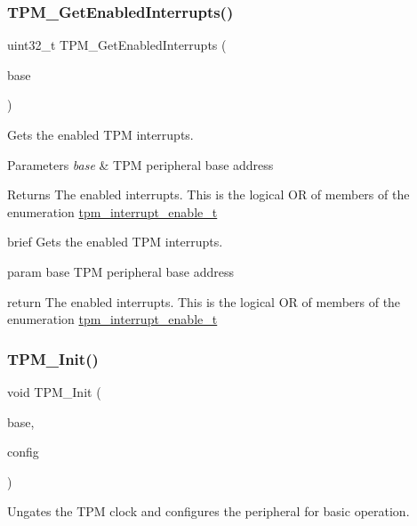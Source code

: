 \subsubsection{\texorpdfstring{TPM\_GetEnabledInterrupts()}{TPM\_GetEnabledInterrupts()}}
{\footnotesize\ttfamily uint32\+\_\+t T\+P\+M\+\_\+\+Get\+Enabled\+Interrupts (\begin{DoxyParamCaption}\item[{\mbox{\hyperlink{struct_t_p_m___type}{T\+P\+M\+\_\+\+Type}} $\ast$}]{base }\end{DoxyParamCaption})}



Gets the enabled T\+PM interrupts. 


\begin{DoxyParams}{Parameters}
{\em base} & T\+PM peripheral base address\\
\hline
\end{DoxyParams}
\begin{DoxyReturn}{Returns}
The enabled interrupts. This is the logical OR of members of the enumeration \mbox{\hyperlink{group__tpm_ga95c8edaff8d8b474bf4796b16413cc16}{tpm\+\_\+interrupt\+\_\+enable\+\_\+t}}
\end{DoxyReturn}
brief Gets the enabled T\+PM interrupts.

param base T\+PM peripheral base address

return The enabled interrupts. This is the logical OR of members of the enumeration \mbox{\hyperlink{group__tpm_ga95c8edaff8d8b474bf4796b16413cc16}{tpm\+\_\+interrupt\+\_\+enable\+\_\+t}} \mbox{\label{group__tpm_gae56e6feacdb75884b00b81256ae4a795}} 
\subsubsection{\texorpdfstring{TPM\_Init()}{TPM\_Init()}}
{\footnotesize\ttfamily void T\+P\+M\+\_\+\+Init (\begin{DoxyParamCaption}\item[{\mbox{\hyperlink{struct_t_p_m___type}{T\+P\+M\+\_\+\+Type}} $\ast$}]{base,  }\item[{const \mbox{\hyperlink{group__tpm_ga5647039a18486c876df5cdeb84c9621d}{tpm\+\_\+config\+\_\+t}} $\ast$}]{config }\end{DoxyParamCaption})}



Ungates the T\+PM clock and configures the peripheral for basic operation. 

